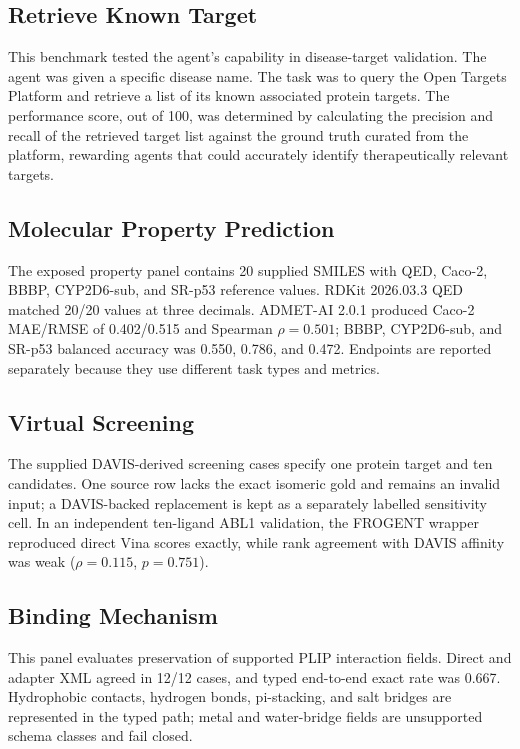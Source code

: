 \documentclass{article}
\begin{document}
\subsection{Retrieve Known Target}

This benchmark tested the agent's capability in disease-target validation. The agent was given a specific disease name. The task was to query the Open Targets Platform and retrieve a list of its known associated protein targets. The performance score, out of 100, was determined by calculating the precision and recall of the retrieved target list against the ground truth curated from the platform, rewarding agents that could accurately identify therapeutically relevant targets.

\subsection{Molecular Property Prediction}

The exposed property panel contains 20 supplied SMILES with QED, Caco-2, BBBP, CYP2D6-sub, and SR-p53 reference values. RDKit 2026.03.3 QED matched 20/20 values at three decimals. ADMET-AI 2.0.1 produced Caco-2 MAE/RMSE of 0.402/0.515 and Spearman $\rho=0.501$; BBBP, CYP2D6-sub, and SR-p53 balanced accuracy was 0.550, 0.786, and 0.472. Endpoints are reported separately because they use different task types and metrics.

\subsection{Virtual Screening}

The supplied DAVIS-derived screening cases specify one protein target and ten candidates. One source row lacks the exact isomeric gold and remains an invalid input; a DAVIS-backed replacement is kept as a separately labelled sensitivity cell. In an independent ten-ligand ABL1 validation, the FROGENT wrapper reproduced direct Vina scores exactly, while rank agreement with DAVIS affinity was weak ($\rho=0.115$, $p=0.751$).

\subsection{Binding Mechanism}
This panel evaluates preservation of supported PLIP interaction fields. Direct and adapter XML agreed in 12/12 cases, and typed end-to-end exact rate was 0.667. Hydrophobic contacts, hydrogen bonds, pi-stacking, and salt bridges are represented in the typed path; metal and water-bridge fields are unsupported schema classes and fail closed.
\end{document}
